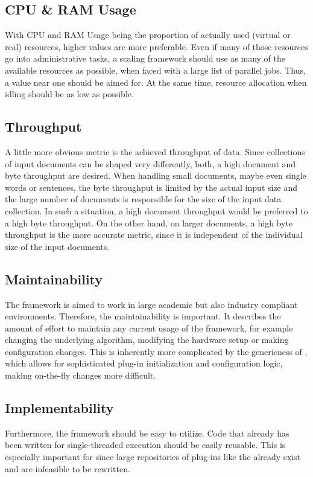 \subsection{CPU \& RAM Usage}
With CPU and RAM Usage being the proportion of actually used (virtual or real) resources, higher values are more preferable. Even if many of those resources go into administrative tasks, a scaling framework should use as many of the available resources as possible, when faced with a large list of parallel jobs. Thus, a value near one should be aimed for. At the same time, resource allocation when idling should be as low as possible.

\subsection{Throughput}
A little more obvious metric is the achieved throughput of data. Since collections of input documents can be shaped very differently, both, a high document and byte throughput are desired. When handling small documents, maybe even single words or sentences, the byte throughput is limited by the actual input size and the large number of documents is responsible for the size of the input data collection. In such a situation, a high document throughput would be preferred to a high byte throughput. On the other hand, on larger documents, a high byte throughput is the more accurate metric, since it is independent of the individual size of the input documents.
\subsection{Maintainability}
The framework is aimed to work in large academic but also industry compliant environments. Therefore, the maintainability is important. It describes the amount of effort to maintain any current usage of the framework, for example changing the underlying \nlp{} algorithm, modifying the hardware setup or making configuration changes. This is inherently more complicated by the genericness of \uima{}, which allows for sophisticated plug-in initialization and configuration logic, making on-the-fly changes more difficult.

\subsection{Implementability}
Furthermore, the framework should be easy to utilize. Code that already has been written for single-threaded execution should be easily reusable. This is especially important for \uima{} since large repositories of plug-ins like the \dkpro{} \cite{dkpro} already exist and are infeasible to be rewritten. 

